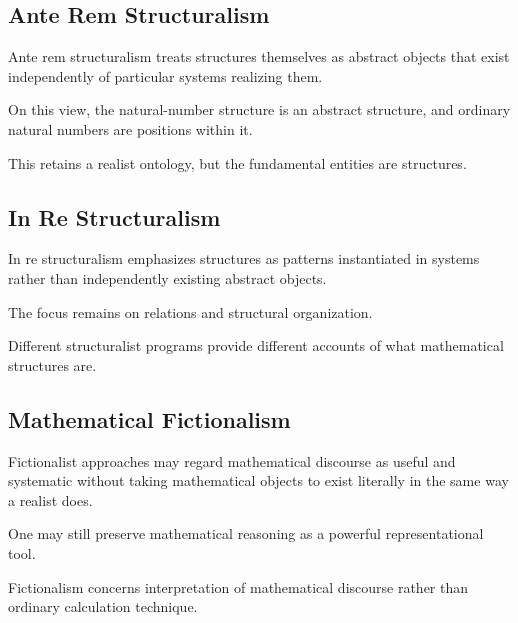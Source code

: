\subsection{Ante Rem Structuralism}
\label{subsec:ante-rem-structuralism}

Ante rem structuralism treats structures themselves as abstract objects that
exist independently of particular systems realizing them.

On this view, the natural-number structure is an abstract structure, and
ordinary natural numbers are positions within it.

This retains a realist ontology, but the fundamental entities are
structures.

\subsection{In Re Structuralism}
\label{subsec:in-re-structuralism}

In re structuralism emphasizes structures as patterns instantiated in
systems rather than independently existing abstract objects.

The focus remains on relations and structural organization.

Different structuralist programs provide different accounts of what
mathematical structures are.

\subsection{Mathematical Fictionalism}
\label{subsec:mathematical-fictionalism}

Fictionalist approaches may regard mathematical discourse as useful and
systematic without taking mathematical objects to exist literally in the
same way a realist does.

One may still preserve mathematical reasoning as a powerful representational
tool.

Fictionalism concerns interpretation of mathematical discourse rather than
ordinary calculation technique.

